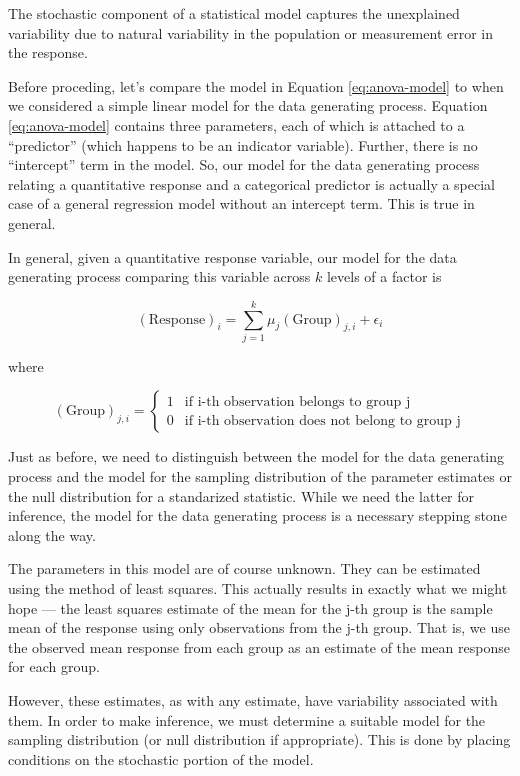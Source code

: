 \documentclass[
]{book}
\theoremstyle{plain}
\theoremstyle{mydefn}
\theoremstyle{myexmpl}
\theoremstyle{remark}
\begin{document}
\begin{rmdkeyidea}
The stochastic component of a statistical model captures the unexplained variability due to natural variability in the population or measurement error in the response.
\end{rmdkeyidea}

Before proceding, let's compare the model in Equation \eqref{eq:anova-model} to when we considered a simple linear model for the data generating process. Equation \eqref{eq:anova-model} contains three parameters, each of which is attached to a ``predictor'' (which happens to be an indicator variable). Further, there is no ``intercept'' term in the model. So, our model for the data generating process relating a quantitative response and a categorical predictor is actually a special case of a general regression model without an intercept term. This is true in general.

\begin{rmdtip}
In general, given a quantitative response variable, our model for the data generating process comparing this variable across \(k\) levels of a factor is

\[(\text{Response})_i = \sum_{j=1}^{k} \mu_j (\text{Group})_{j, i} + \epsilon_i\]

where

\[(\text{Group})_{j,i} = \begin{cases}
  1 & \text{if i-th observation belongs to group j} \\
  0 & \text{if i-th observation does not belong to group j}
  \end{cases}\]
\end{rmdtip}

Just as before, we need to distinguish between the model for the data generating process and the model for the sampling distribution of the parameter estimates or the null distribution for a standarized statistic. While we need the latter for inference, the model for the data generating process is a necessary stepping stone along the way.

The parameters in this model are of course unknown. They can be estimated using the method of least squares. This actually results in exactly what we might hope --- the least squares estimate of the mean for the j-th group is the sample mean of the response using only observations from the j-th group. That is, we use the observed mean response from each group as an estimate of the mean response for each group.

However, these estimates, as with any estimate, have variability associated with them. In order to make inference, we must determine a suitable model for the sampling distribution (or null distribution if appropriate). This is done by placing conditions on the stochastic portion of the model.
\end{document}
